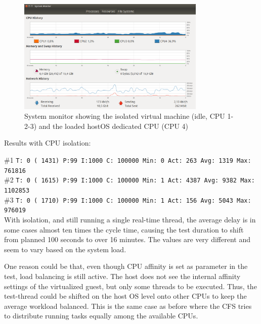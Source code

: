 \documentclass[]{scrartcl}
\begin{document}
\begin{figure}[t]
	\centering
	\includegraphics[width=0.8\textwidth]{test-cpu}
	\caption{System monitor showing the isolated virtual machine (idle, CPU 1-2-3) and the loaded hostOS dedicated CPU (CPU 4)}
	\label{fig:test-cpu}
\end{figure}
\bigskip


\noindent Results with CPU isolation:

\noindent \small \#1 \texttt{T: 0 ( 1431) P:99 I:1000 C: 100000 Min: 0 Act:  263 Avg: 1319 Max:  761816}\\
\noindent \small \#2 \texttt{T: 0 ( 1615) P:99 I:1000 C: 100000 Min: 1 Act: 4387 Avg: 9382 Max: 1102853}\\
\noindent \small \#3 \texttt{T: 0 ( 1710) P:99 I:1000 C: 100000 Min: 1 Act:  156 Avg: 5043 Max:  976019}\\


With isolation, and still running a single real-time thread, the average delay is in some cases almost ten times the cycle time, causing the test duration to shift from planned 100 seconds to over 16 minutes. The values are very different and seem to vary based on the system load. 

One reason could be that, even though CPU affinity is set as parameter in the test, load balancing is still active. The host does not see the internal affinity settings of the virtualized guest, but only some threads to be executed.
Thus, the test-thread could be shifted on the host OS level onto other CPUs to keep the average workload balanced. This is the same case as before where the CFS tries to distribute running tasks equally among the available CPUs.
\end{document}
